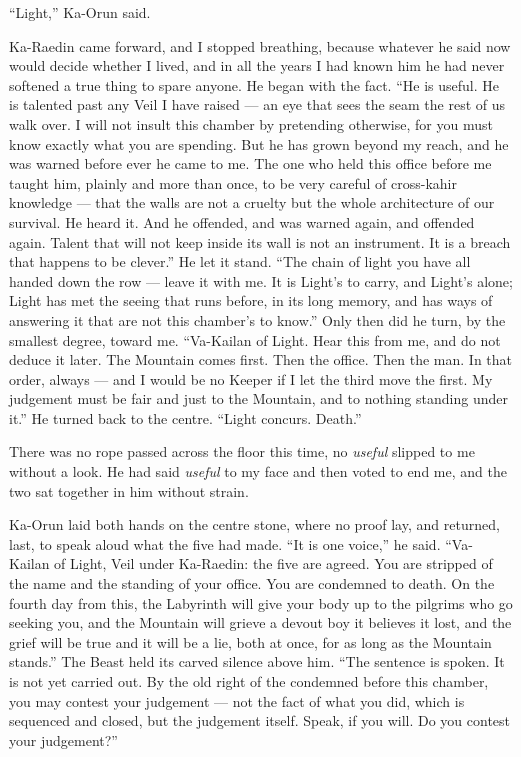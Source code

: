 ``Light,'' Ka-Orun said.\par

Ka-Raedin came forward, and I stopped breathing, because whatever he said now would decide whether I lived, and in all the years I had known him he had never softened a true thing to spare anyone. He began with the fact. ``He is useful. He is talented past any Veil I have raised --- an eye that sees the seam the rest of us walk over. I will not insult this chamber by pretending otherwise, for you must know exactly what you are spending. But he has grown beyond my reach, and he was warned before ever he came to me. The one who held this office before me taught him, plainly and more than once, to be very careful of cross-kahir knowledge --- that the walls are not a cruelty but the whole architecture of our survival. He heard it. And he offended, and was warned again, and offended again. Talent that will not keep inside its wall is not an instrument. It is a breach that happens to be clever.'' He let it stand. ``The chain of light you have all handed down the row --- leave it with me. It is Light's to carry, and Light's alone; Light has met the seeing that runs before, in its long memory, and has ways of answering it that are not this chamber's to know.'' Only then did he turn, by the smallest degree, toward me. ``Va-Kailan of Light. Hear this from me, and do not deduce it later. The Mountain comes first. Then the office. Then the man. In that order, always --- and I would be no Keeper if I let the third move the first. My judgement must be fair and just to the Mountain, and to nothing standing under it.'' He turned back to the centre. ``Light concurs. Death.''\par

There was no rope passed across the floor this time, no \emph{useful} slipped to me without a look. He had said \emph{useful} to my face and then voted to end me, and the two sat together in him without strain.\par

Ka-Orun laid both hands on the centre stone, where no proof lay, and returned, last, to speak aloud what the five had made. ``It is one voice,'' he said. ``Va-Kailan of Light, Veil under Ka-Raedin: the five are agreed. You are stripped of the name and the standing of your office. You are condemned to death. On the fourth day from this, the Labyrinth will give your body up to the pilgrims who go seeking you, and the Mountain will grieve a devout boy it believes it lost, and the grief will be true and it will be a lie, both at once, for as long as the Mountain stands.'' The Beast held its carved silence above him. ``The sentence is spoken. It is not yet carried out. By the old right of the condemned before this chamber, you may contest your judgement --- not the fact of what you did, which is sequenced and closed, but the judgement itself. Speak, if you will. Do you contest your judgement?''\par
 
